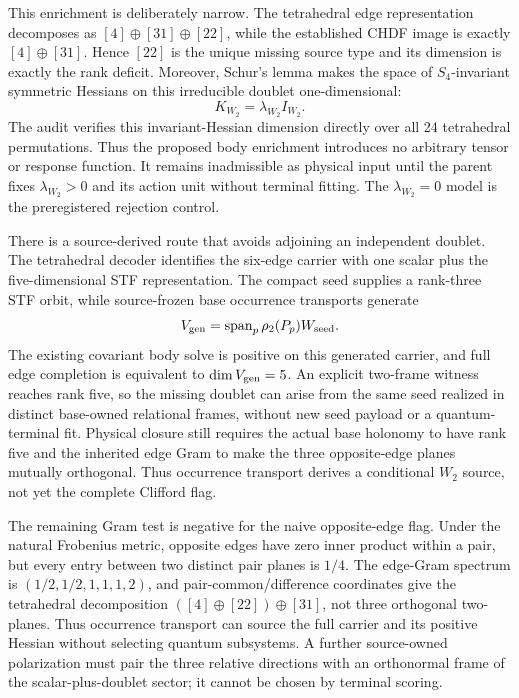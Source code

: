 \documentclass[11pt]{article}
\begin{document}
This enrichment is deliberately narrow. The tetrahedral edge representation
decomposes as $[4]\oplus[31]\oplus[22]$, while the established CHDF image is
exactly $[4]\oplus[31]$. Hence $[22]$ is the unique missing source type and
its dimension is exactly the rank deficit. Moreover, Schur's lemma makes the
space of $S_4$-invariant symmetric Hessians on this irreducible doublet
one-dimensional:
\begin{equation}
 K_{W_2}=\lambda_{W_2}I_{W_2}.
 \label{eq:w2rigidity}
\end{equation}
The audit verifies this invariant-Hessian dimension directly over all 24
tetrahedral permutations. Thus the proposed body enrichment introduces no
arbitrary tensor or response function. It remains inadmissible as physical
input until the parent fixes $\lambda_{W_2}>0$ and its action unit without
terminal fitting. The $\lambda_{W_2}=0$ model is the preregistered rejection
control.

There is a source-derived route that avoids adjoining an independent doublet.
The tetrahedral decoder identifies the six-edge carrier with one scalar plus
the five-dimensional STF representation. The compact seed supplies a
rank-three STF orbit, while source-frozen base occurrence transports generate
\begin{equation}
 V_{\rm gen}=\operatorname{span}_p\rho_2(P_p)W_{\rm seed}.
 \label{eq:occurrencegen}
\end{equation}
The existing covariant body solve is positive on this generated carrier, and
full edge completion is equivalent to $\dim V_{\rm gen}=5$. An explicit
two-frame witness reaches rank five, so the missing doublet can arise from the
same seed realized in distinct base-owned relational frames, without new seed
payload or a quantum-terminal fit. Physical closure still requires the actual
base holonomy to have rank five and the inherited edge Gram to make the three
opposite-edge planes mutually orthogonal. Thus occurrence transport derives a
conditional $W_2$ source, not yet the complete Clifford flag.

The remaining Gram test is negative for the naive opposite-edge flag. Under
the natural Frobenius metric, opposite edges have zero inner product within a
pair, but every entry between two distinct pair planes is $1/4$. The edge-Gram
spectrum is
$(1/2,1/2,1,1,1,2)$, and pair-common/difference coordinates give the
tetrahedral decomposition $([4]\oplus[22])\oplus[31]$, not three orthogonal
two-planes. Thus occurrence transport can source the full carrier and its
positive Hessian without selecting quantum subsystems. A further source-owned
polarization must pair the three relative directions with an orthonormal frame
of the scalar-plus-doublet sector; it cannot be chosen by terminal scoring.
\end{document}
